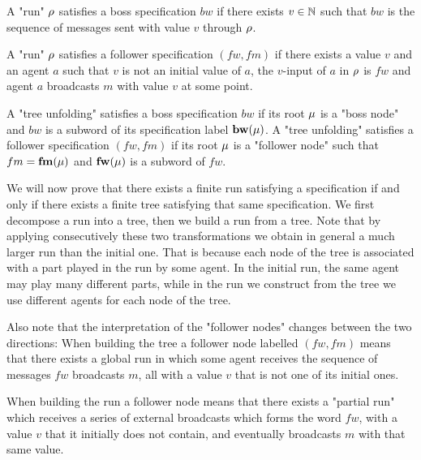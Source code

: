 

\begin{definition}
	A "run" $\rho$ satisfies a boss specification $bw$ if there exists $v \in \mathbb{N}$ such that $bw$ is the sequence of messages sent with value $v$ through $\rho$.
	
	A "run" $\rho$ satisfies a follower specification $(fw, fm)$ if there exists a value $v$ and an agent $a$ such that $v$ is not an initial value of $a$, the $v$-input of $a$ in $\rho$ is $fw$ and agent $a$ broadcasts $m$ with value $v$ at some point.
	
	A "tree unfolding" satisfies a boss specification $bw$ if its root $\mu$ is a "boss node" and $bw$ is a subword of its specification label $\mathbf{bw}(\mu)$.
	A "tree unfolding" satisfies a follower specification $(fw, fm)$ if its root $\mu$ is a "follower node" such that $fm=\mathbf{fm}(\mu)$ and  $\mathbf{fw}(\mu)$ is a subword of $fw$.
\end{definition}

We will now prove that there exists a finite run satisfying a specification if and only if there exists a finite tree satisfying that same specification.
We first decompose a run into a tree, then we build a run from a tree. Note that by applying consecutively these two transformations we obtain in general a much larger run than the initial one. That is because each node of the tree is associated with a part played in the run by some agent. In the initial run, the same agent may play many different parts, while in the run we construct from the tree we use different agents for each node of the tree.

Also note that the interpretation of the "follower nodes" changes between the two directions: When building the tree a follower node labelled $(fw, fm)$ means that there exists a global run in which some agent receives the sequence of messages $fw$ broadcasts $m$, all with a value $v$ that is not one of its initial ones.

When building the run a follower node means that there exists a "partial run" which receives a series of external broadcasts which forms the word $fw$, with a value $v$ that it initially does not contain, and eventually broadcasts $m$ with that same value.

